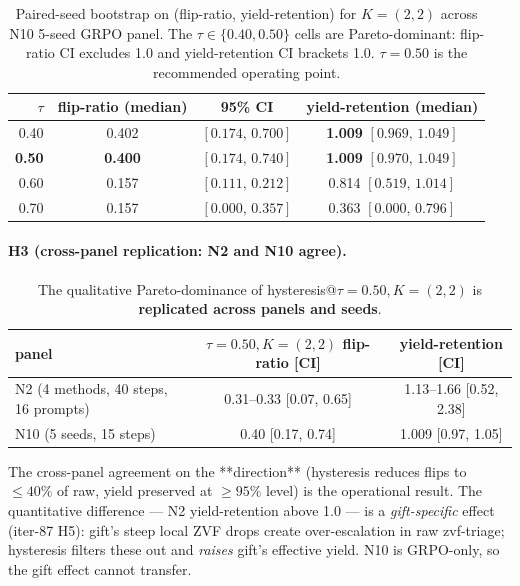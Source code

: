\begin{table}[h]
\centering
\small
\begin{tabular}{rccc}
\toprule
$\tau$ & flip-ratio (median) & 95\% CI & yield-retention (median) \\
\midrule
0.40 & 0.402 & $[0.174,\, 0.700]$ & \textbf{1.009} $[0.969,\, 1.049]$ \\
\textbf{0.50} & \textbf{0.400} & $\mathbf{[0.174,\, 0.740]}$ & \textbf{1.009} $[0.970,\, 1.049]$ \\
0.60 & 0.157 & $[0.111,\, 0.212]$ & 0.814 $[0.519,\, 1.014]$ \\
0.70 & 0.157 & $[0.000,\, 0.357]$ & 0.363 $[0.000,\, 0.796]$ \\
\bottomrule
\end{tabular}
\caption{Paired-seed bootstrap on (flip-ratio, yield-retention) for
$K=(2,2)$ across N10 5-seed GRPO panel. The $\tau \in \{0.40, 0.50\}$
cells are Pareto-dominant: flip-ratio CI excludes 1.0 and yield-retention
CI brackets 1.0. $\tau = 0.50$ is the recommended operating point.}
\label{tab:p7-hyst-n10}
\end{table}

\paragraph{H3 (cross-panel replication: N2 and N10 agree).}

\begin{table}[h]
\centering
\small
\begin{tabular}{lcc}
\toprule
panel & $\tau=0.50, K=(2,2)$ flip-ratio [CI] & yield-retention [CI] \\
\midrule
N2 (4 methods, 40 steps, 16 prompts) & 0.31--0.33 [0.07, 0.65] & 1.13--1.66 [0.52, 2.38] \\
N10 (5 seeds, 15 steps)             & 0.40 [0.17, 0.74]      & 1.009 [0.97, 1.05] \\
\bottomrule
\end{tabular}
\caption{The qualitative Pareto-dominance of hysteresis@$\tau{=}0.50,
K{=}(2,2)$ is \textbf{replicated across panels and seeds}.}
\label{tab:p7-hyst-cross-panel}
\end{table}

The cross-panel agreement on the **direction** (hysteresis reduces flips
to $\le 40\%$ of raw, yield preserved at $\ge 95\%$ level) is the
operational result. The quantitative difference — N2 yield-retention
above 1.0 — is a \emph{gift-specific} effect (iter-87 H5): gift's steep
local ZVF drops create over-escalation in raw zvf-triage; hysteresis
filters these out and \emph{raises} gift's effective yield. N10 is
GRPO-only, so the gift effect cannot transfer.

